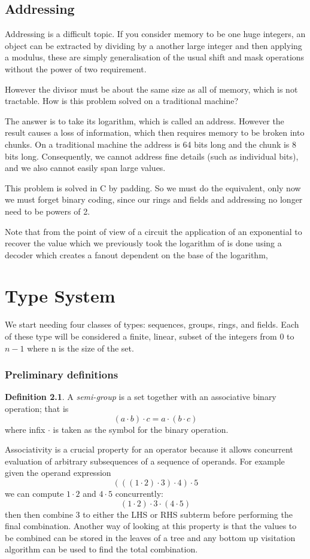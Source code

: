 \documentclass[oneside]{book}
\theoremstyle{plain}
\theoremstyle{definition}
\newtheorem{definition}{Definition}
\theoremstyle{plain}
\begin{document}
\section{Addressing}
Addressing is a difficult topic. If you consider memory to be one
huge integers, an object can be extracted by dividing by a
another large integer and then applying a modulus, these are
simply generalisation of the usual shift and mask operations without
the power of two requirement.

However the divisor must be about the same size as all of memory,
which is not tractable. How is this problem solved on a traditional
machine?

The answer is to take its logarithm, which is called an address.
However the result causes a loss of information, which then requires
memory to be broken into chunks. On a traditional machine the address
is 64 bits long and the chunk is 8 bits long. Consequently, we cannot
address fine details (such as individual bits), and we also cannot
easily span large values.

This problem is solved in C by padding. So we must do the equivalent,
only now we must forget binary coding, since our rings and fields
and addressing no longer need to be powers of 2.

Note that from the point of view of a circuit the application of an exponential
to recover the value which we previously took the logarithm of is done
using a decoder which creates a fanout dependent on the base of the logarithm,

\chapter{Type System}
We start needing four classes of types: sequences, groups, rings, and fields.
Each of these type will be considered a finite, linear, subset of the integers 
from 0 to $n-1$ where n is the size of the set.

\subsection{Preliminary definitions}
\begin{definition}
A {\em semi-group} is a set together with an associative binary operation; that is
$$(a \cdot b)\cdot c = a \cdot (b \cdot c)$$
where infix $\cdot$ is taken as the symbol for the binary operation.
\end{definition}

Associativity is a crucial property for an operator because it allows concurrent
evaluation of arbitrary subsequences of a sequence of operands. For example given
the operand expression 
$$(((1\cdot2)\cdot3)\cdot4)\cdot5$$
we can compute $1\cdot2$ and $4\cdot5$ concurrently:
$$(1\cdot2)\cdot3\cdot(4\cdot5)$$
then then combine 3 to either the LHS or RHS subterm before performing the final combination.
Another way of looking at this property is that the values to be combined can be stored in
the leaves of a tree and any bottom up visitation algorithm can be used to find the total combination.
\end{document}
